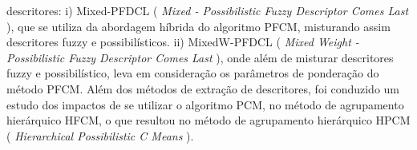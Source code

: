 descritores: i) Mixed-PFDCL ({ \it Mixed - Possibilistic Fuzzy Descriptor Comes Last\/ }), que se
utiliza da abordagem híbrida do algoritmo PFCM, misturando assim descritores fuzzy e
possibilísticos. ii) MixedW-PFDCL ({ \it Mixed Weight - Possibilistic Fuzzy Descriptor Comes Last\/
}), onde além de misturar descritores fuzzy e possibilístico, leva em consideração os parâmetros de
ponderação do método PFCM.  Além dos métodos de extração de descritores, foi conduzido um estudo dos
impactos de se utilizar o algoritmo PCM, no método de agrupamento hierárquico HFCM, o que resultou
no método de agrupamento hierárquico HPCM ({ \it Hierarchical Possibilistic C Means\/ }).
